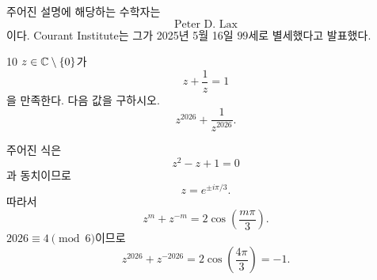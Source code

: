 \begin{solution}
주어진 설명에 해당하는 수학자는
\[
    \boxed{\text{Peter D. Lax}}
\]
이다. Courant Institute는 그가 2025년 5월 16일 $99$세로 별세했다고 발표했다.
\end{solution}

\begin{problem}{10}
$z\in\mathbb{C}\setminus\{0\}$가
\[
    z+\frac{1}{z}=1
\]
을 만족한다. 다음 값을 구하시오.
\[
    z^{2026}+\frac{1}{z^{2026}}.
\]
\end{problem}

\begin{solution}
주어진 식은
\[
    z^2-z+1=0
\]
과 동치이므로
\[
    z=e^{\pm i\pi/3}.
\]
따라서
\[
    z^m+z^{-m}
    =
    2\cos\left(\frac{m\pi}{3}\right).
\]
$2026\equiv4\pmod6$이므로
\[
    \boxed{
        z^{2026}+z^{-2026}
        =
        2\cos\left(\frac{4\pi}{3}\right)
        =-1
    }.
\]
\end{solution}
